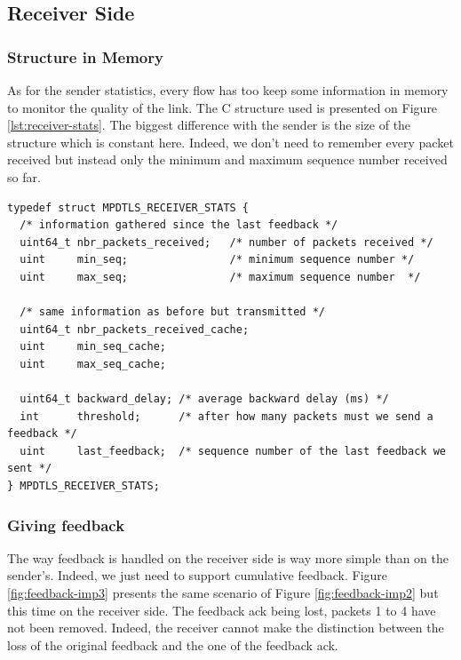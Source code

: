\subsection{Receiver Side}

\subsubsection{Structure in Memory}

As for the sender statistics, every flow has too keep some information in memory to monitor the quality of the link. The C structure used is presented on Figure \ref{lst:receiver-stats}. The biggest difference with the sender is the size of the structure which is constant here. Indeed, we don't need to remember every packet received but instead only the minimum and maximum sequence number received so far.

\begin{lstlisting}[caption=Receiver structure to store statistics, label=lst:receiver-stats]
typedef struct MPDTLS_RECEIVER_STATS {
  /* information gathered since the last feedback */
  uint64_t nbr_packets_received;   /* number of packets received */
  uint     min_seq;                /* minimum sequence number */
  uint     max_seq;                /* maximum sequence number  */
  
  /* same information as before but transmitted */
  uint64_t nbr_packets_received_cache;
  uint     min_seq_cache;
  uint     max_seq_cache;
  
  uint64_t backward_delay; /* average backward delay (ms) */
  int      threshold;      /* after how many packets must we send a feedback */
  uint     last_feedback;  /* sequence number of the last feedback we sent */
} MPDTLS_RECEIVER_STATS;
\end{lstlisting}

\subsubsection{Giving feedback}

The way feedback is handled on the receiver side is way more simple than on the sender's. Indeed, we just need to support cumulative feedback. Figure \ref{fig:feedback-imp3} presents the same scenario of Figure \ref{fig:feedback-imp2} but this time on the receiver side. The feedback ack being lost, packets 1 to 4 have not been removed. Indeed, the receiver cannot make the distinction between the loss of the original feedback and the one of the feedback ack.

